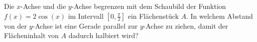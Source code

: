 \begin{ExerciseBlock}
Die $x$-Achse und die $y$-Achse begrenzen mit dem Schaubild der Funktion $f(x) = 2\cos(x)$ im Intervall $[0,\frac{\pi}{2}]$ ein Flächenstück $A$. In welchem Abstand von der $y$-Achse ist eine Gerade parallel zur $y$-Achse zu ziehen, damit der Flächeninhalt von $A$ dadurch halbiert wird?

\end{ExerciseBlock}
